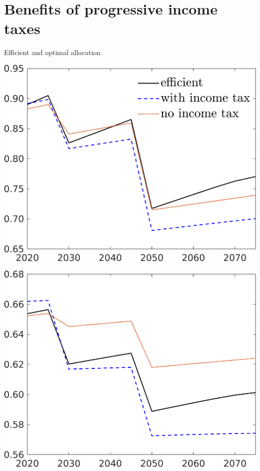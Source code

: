 \documentclass[11pt,aspectratio=169]{beamer}
\begin{document}
\section*{Benefits of progressive income taxes}
\begin{frame}{Efficient and optimal allocation }
	\centering
	\begin{minipage}[]{0.23\textwidth}
		\includegraphics[width=1\textwidth]{../codding_model/own_basedOnFried/optimalPol_elastS_DisuSci/figures/all_1705/C_CompEffOPT_T_NoTaus_spillover0_sep1_BN1_ineq0_red0_etaa0.79_lgd1.png}
	\end{minipage}
	\begin{minipage}[]{0.23\textwidth}
		\includegraphics[width=1\textwidth]{../codding_model/own_basedOnFried/optimalPol_elastS_DisuSci/figures/all_1705/hh_CompEffOPT_T_NoTaus_spillover0_sep1_BN1_ineq0_red0_etaa0.79_lgd0.png}

\end{minipage}
\end{frame}
\end{document}
